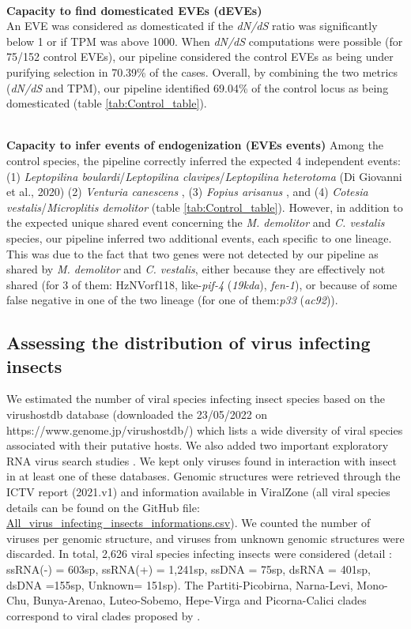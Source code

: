 \textbf{\\Capacity to find domesticated EVEs (dEVEs)}
\\An EVE was considered as domesticated if the \textit{dN/dS} ratio was significantly below 1 or if TPM was above 1000. When \textit{dN/dS} computations were possible (for 75/152 control EVEs), our pipeline considered the control EVEs as being under purifying selection in 70.39\% of the cases. Overall, by combining the two metrics (\textit{dN/dS} and TPM), our pipeline identified 69.04\% of the control locus as being domesticated (table \ref{tab:Control_table}).

\textbf{\\Capacity to infer events of endogenization (EVEs events)}
Among the control species, the pipeline correctly inferred the expected 4 independent events: (1) \textit{Leptopilina boulardi}/\textit{Leptopilina clavipes}/\textit{Leptopilina heterotoma} (Di Giovanni et al., 2020) (2) \textit{Venturia canescens} \citep{pichon_recurrent_2015}, (3) \textit{Fopius arisanus} \citep{burke_rapid_2018}, and (4) \textit{Cotesia vestalis}/\textit{Microplitis demolitor} \citep{bezier_polydnaviruses_2009} (table \ref{tab:Control_table}).
However, in addition to the expected unique shared event concerning the \textit{M. demolitor} and \textit{C. vestalis} species, our pipeline inferred two additional events, each specific to one lineage.  This was due to the fact that two genes were not detected by our pipeline as shared by \textit{M. demolitor} and \textit{C. vestalis}, either because they are effectively not shared (for 3 of them: HzNVorf118, like-\textit{pif-4} (\textit{19kda}), \textit{fen-1}), or because of some false negative in one of the two lineage (for one  of them:\textit{p33} (\textit{ac92})).


\subsection{Assessing  the distribution of virus infecting insects}
\label{sec:MM-8}
We estimated the number of viral species infecting insect species based on the virushostdb database (downloaded the 23/05/2022 on https://www.genome.jp/virushostdb/) which lists a wide diversity of viral species associated with their putative hosts. We also added two important exploratory RNA virus search studies \citep{shi_redefining_2016, wu_abundant_2020}. We kept only viruses found in interaction with insect in at least one of these databases. Genomic structures were retrieved through the ICTV report (2021.v1) and information available in ViralZone (all viral species details can be found on the GitHub file: \href{https://github.com/BenjaminGuinet/PhD_defense/blob/main/Supplementary_paper1/All_virus_infecting_insects_informations.csv}{All\_virus\_infecting\_insects\_informations.csv}). We counted the number of viruses per genomic structure, and viruses from unknown genomic structures were discarded.  In total, 2,626 viral species infecting insects were considered (detail : ssRNA(-) = 603sp, ssRNA(+) = 1,241sp, ssDNA = 75sp, dsRNA = 401sp, dsDNA =155sp, Unknown= 151sp). The Partiti-Picobirna, Narna-Levi, Mono-Chu, Bunya-Arenao, Luteo-Sobemo, Hepe-Virga and Picorna-Calici clades correspond to viral clades proposed by \citep{shi_redefining_2016}.

